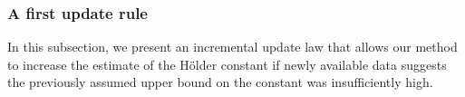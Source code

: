 \label{sec:lazylipconstupdate}
%
%
%

\subsubsection{A first update rule}
 In this subsection, we present an incremental update law that allows our method to increase the estimate of the H\"older constant if newly available data suggests the previously assumed upper bound on the constant was insufficiently high.
 
